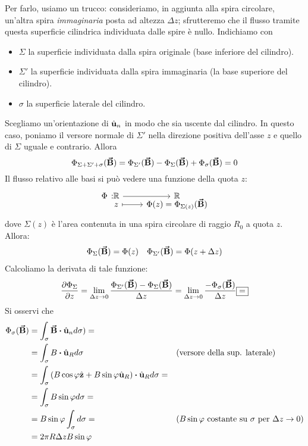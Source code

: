 Per farlo, usiamo un trucco: consideriamo, in aggiunta alla spira circolare, un'altra spira \textit{immaginaria} posta ad altezza $\Delta z$; sfrutteremo che il flusso tramite questa superficie cilindrica individuata dalle spire è nullo. Indichiamo con
\begin{itemize}
	\item $\Sigma$ la superficie individuata dalla spira originale (base inferiore del cilindro).
	\item $\Sigma'$ la superficie individuata dalla spira immaginaria (la base superiore del cilindro).
	\item $\sigma$ la superficie laterale del cilindro.
\end{itemize}
Scegliamo un'orientazione di $\hat{\mathbf{u}}_n$ in modo che sia uscente dal cilindro.
In questo caso, poniamo il versore normale di $\Sigma'$ nella direzione positiva dell'asse $z$ e quello di $\Sigma$ uguale e contrario. Allora
\begin{equation*}
	\Phi_{\Sigma+\Sigma'+\sigma}(\vb*{\va{B}})=\Phi_{\Sigma'}(\vb*{\va{B}})-\Phi_{\Sigma}(\vb*{\va{B}})+\Phi_{\sigma}(\vb*{\va{B}})=0
\end{equation*}
Il flusso relativo alle basi si può vedere una funzione della quota $z$:
\begin{equation*}
	\funztot[\Phi]{\realset}{\realset}{z}{\Phi(z)=\Phi_{\Sigma(z)}(\vba{B})}
\end{equation*}
dove $\Sigma(z)$ è l'area contenuta in una spira circolare di raggio $R_0$ a quota $z$. Allora:
\begin{align*}
	\Phi_{\Sigma}(\vb*{\va{B}})=\Phi(z)&&\Phi_{\Sigma'}(\vb*{\va{B}})=\Phi(z+\Delta z)
\end{align*}
Calcoliamo la derivata di tale funzione:
\begin{equation*}
	\pdv{\Phi_{\Sigma}}{z}=\lim_{\Delta z\to 0}\frac{\Phi_{\Sigma'}(\vba{B})-\Phi_{\Sigma}(\vba{B})}{\Delta z}=\lim_{\Delta z\to 0}\frac{-\Phi_{\sigma}(\vba{B})}{\Delta z}\squarequal
\end{equation*}
Si osservi che
\begin{align*}
	\Phi_{\sigma}(\vba{B})&=\int_{\sigma}\vba{B}\vdot\vbh{u}_nd\sigma)=&&\\
	&=\int_{\sigma}B\vdot\vbh{u}_Rd\sigma&&\text{(versore della sup. laterale)}\\
	&=\int_{\sigma}\left(B\cos\phi\vbh{z}+B\sin\phi\vbh{u}_R\right)\vdot\vbh{u}_Rd\sigma=&&\\
	&=\int_{\sigma}B\sin\phi d\sigma=&&\\
	&=B\sin\phi\int_{\sigma}d\sigma=&&\text{(}B\sin\phi\ \text{costante su}\ \sigma\ \text{per}\ \Delta z\to 0\text{)}\\
	&=2\pi R \Delta z B\sin\phi&&
\end{align*}
